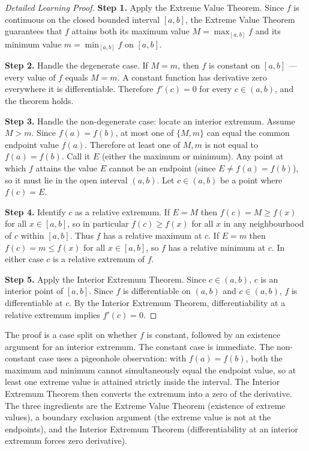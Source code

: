 \begin{proof}[Detailed Learning Proof]
\LRAProofBodyStart

\textbf{Step 1.} Apply the Extreme Value Theorem. Since $f$ is continuous on the closed bounded interval $[a,b]$, the Extreme Value Theorem guarantees that $f$ attains both its maximum value $M = \max_{[a,b]} f$ and its minimum value $m = \min_{[a,b]} f$ on $[a,b]$.

\textbf{Step 2.} Handle the degenerate case. If $M = m$, then $f$ is constant on $[a,b]$ --- every value of $f$ equals $M = m$. A constant function has derivative zero everywhere it is differentiable. Therefore $f'(c) = 0$ for every $c \in (a,b)$, and the theorem holds.

\textbf{Step 3.} Handle the non-degenerate case: locate an interior extremum. Assume $M > m$. Since $f(a) = f(b)$, at most one of $\{M, m\}$ can equal the common endpoint value $f(a)$. Therefore at least one of $M, m$ is not equal to $f(a) = f(b)$. Call it $E$ (either the maximum or minimum). Any point at which $f$ attains the value $E$ cannot be an endpoint (since $E \neq f(a) = f(b)$), so it must lie in the open interval $(a,b)$. Let $c \in (a,b)$ be a point where $f(c) = E$.

\textbf{Step 4.} Identify $c$ as a relative extremum. If $E = M$ then $f(c) = M \geq f(x)$ for all $x \in [a,b]$, so in particular $f(c) \geq f(x)$ for all $x$ in any neighbourhood of $c$ within $[a,b]$. Thus $f$ has a relative maximum at $c$. If $E = m$ then $f(c) = m \leq f(x)$ for all $x \in [a,b]$, so $f$ has a relative minimum at $c$. In either case $c$ is a relative extremum of $f$.

\textbf{Step 5.} Apply the Interior Extremum Theorem. Since $c \in (a,b)$, $c$ is an interior point of $[a,b]$. Since $f$ is differentiable on $(a,b)$ and $c \in (a,b)$, $f$ is differentiable at $c$. By the Interior Extremum Theorem, differentiability at a relative extremum implies $f'(c) = 0$.
\end{proof}

\begin{remark*}
The proof is a case split on whether $f$ is constant, followed by an existence argument for an interior extremum. The constant case is immediate. The non-constant case uses a pigeonhole observation: with $f(a) = f(b)$, both the maximum and minimum cannot simultaneously equal the endpoint value, so at least one extreme value is attained strictly inside the interval. The Interior Extremum Theorem then converts the extremum into a zero of the derivative. The three ingredients are the Extreme Value Theorem (existence of extreme values), a boundary exclusion argument (the extreme value is not at the endpoints), and the Interior Extremum Theorem (differentiability at an interior extremum forces zero derivative).
\end{remark*}

